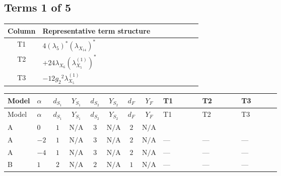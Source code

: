 \documentclass[8pt]{article}
\begin{document}
\begin{landscape}
\subsection*{Terms 1 of 5}
\begin{center}
\begin{tabular}{@{}c >{\raggedright\arraybackslash}p{0.82\linewidth}@{}}
\toprule
Column & Representative term structure \\
\midrule
T1 & \(\displaystyle 4 \left({\lambda_5}\right)^{*} \left({\lambda_{X_{14}}}\right)^{*}\) \\
\midrule
T2 & \(\displaystyle +24 {\lambda_{X_{6}}} \left({\lambda_{X_{5}}^{(1)}}\right)^{*}\) \\
\midrule
T3 & \(\displaystyle -12 {g_2}^2 {\lambda_{X_{5}}^{(1)}}\) \\
\midrule
\bottomrule
\end{tabular}
\end{center}
\smallskip
\tiny
\begin{longtable}{@{}llcccccc >{\raggedright\arraybackslash}p{0.21\linewidth} >{\raggedright\arraybackslash}p{0.21\linewidth} >{\raggedright\arraybackslash}p{0.21\linewidth}@{}}
\toprule
Model & $\alpha$ & $d_{S_1}$ & $Y_{S_1}$ & $d_{S_2}$ & $Y_{S_2}$ & $d_F$ & $Y_F$ & T1 & T2 & T3 \\
\midrule
\endfirsthead
\toprule
Model & $\alpha$ & $d_{S_1}$ & $Y_{S_1}$ & $d_{S_2}$ & $Y_{S_2}$ & $d_F$ & $Y_F$ & T1 & T2 & T3 \\
\midrule
\endhead
A & $0$ & $1$ & $\text{N/A}$ & $3$ & $\text{N/A}$ & $2$ & $\text{N/A}$ & \scriptsize\adjustbox{max width=\linewidth}{$\begin{gathered} 4 \left({\lambda_5}\right)^{*} \left({\lambda_{X_{14}}}\right)^{*}\end{gathered}$} & \scriptsize\adjustbox{max width=\linewidth}{$\begin{gathered} +24 {\lambda_{X_{6}}} \left({\lambda_{X_{5}}^{(1)}}\right)^{*}\end{gathered}$} & \scriptsize\adjustbox{max width=\linewidth}{$\begin{gathered} -12 {g_2}^2 {\lambda_{X_{5}}^{(1)}}\end{gathered}$} \\
\midrule
A & $-2$ & $1$ & $\text{N/A}$ & $3$ & $\text{N/A}$ & $2$ & $\text{N/A}$ & --- & --- & --- \\
\midrule
A & $-4$ & $1$ & $\text{N/A}$ & $3$ & $\text{N/A}$ & $2$ & $\text{N/A}$ & --- & --- & --- \\
\midrule
B & $1$ & $2$ & $\text{N/A}$ & $2$ & $\text{N/A}$ & $1$ & $\text{N/A}$ & --- & --- & --- \\

\end{longtable}
\end{landscape}
\end{document}
